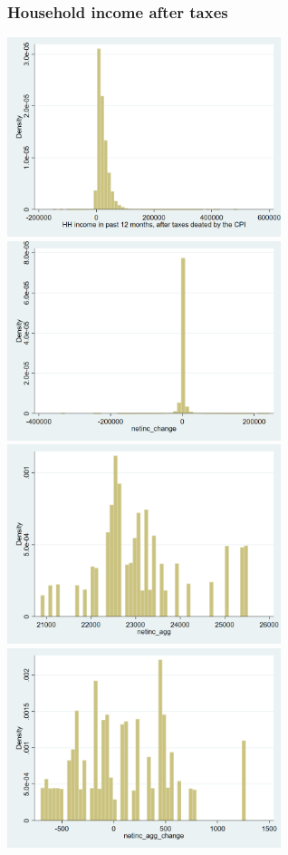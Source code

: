 \documentclass[12pt,a4paper]{article}
\begin{document}
\subsubsection*{Household income after taxes}
\begin{center}
\includegraphics[width=8cm]{netinc.png}
\includegraphics[width=8cm]{netinc_change.png}\\
\includegraphics[width=8cm]{netinc_agg.png}
\includegraphics[width=8cm]{netinc_agg_change.png}\\

\end{center}
\end{document}
